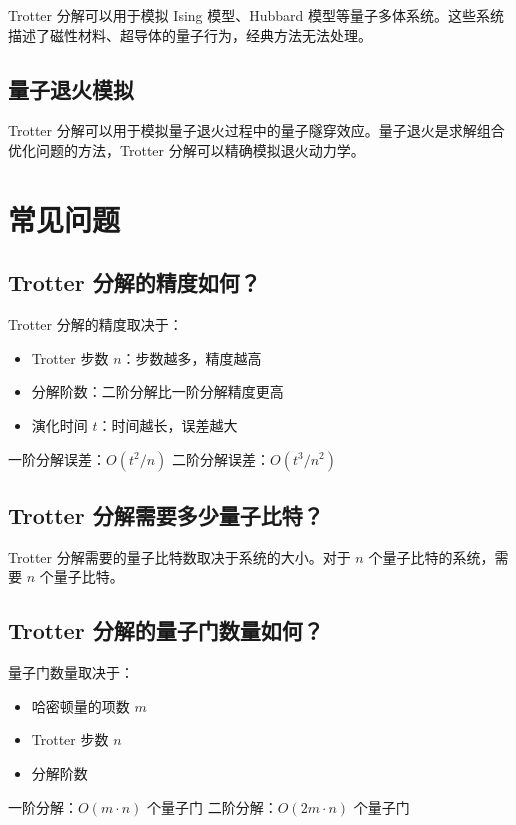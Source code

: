 \documentclass[12pt,a4paper]{article}
\begin{document}
Trotter 分解可以用于模拟 Ising 模型、Hubbard 模型等量子多体系统。这些系统描述了磁性材料、超导体的量子行为，经典方法无法处理。

\subsection{量子退火模拟}

Trotter 分解可以用于模拟量子退火过程中的量子隧穿效应。量子退火是求解组合优化问题的方法，Trotter 分解可以精确模拟退火动力学。

\section{常见问题}

\subsection{Trotter 分解的精度如何？}

Trotter 分解的精度取决于：
\begin{itemize}
  \item Trotter 步数 $n$：步数越多，精度越高
  \item 分解阶数：二阶分解比一阶分解精度更高
  \item 演化时间 $t$：时间越长，误差越大
\end{itemize}

一阶分解误差：$O(t^2/n)$
二阶分解误差：$O(t^3/n^2)$

\subsection{Trotter 分解需要多少量子比特？}

Trotter 分解需要的量子比特数取决于系统的大小。对于 $n$ 个量子比特的系统，需要 $n$ 个量子比特。

\subsection{Trotter 分解的量子门数量如何？}

量子门数量取决于：
\begin{itemize}
  \item 哈密顿量的项数 $m$
  \item Trotter 步数 $n$
  \item 分解阶数
\end{itemize}

一阶分解：$O(m \cdot n)$ 个量子门
二阶分解：$O(2m \cdot n)$ 个量子门
\end{document}
